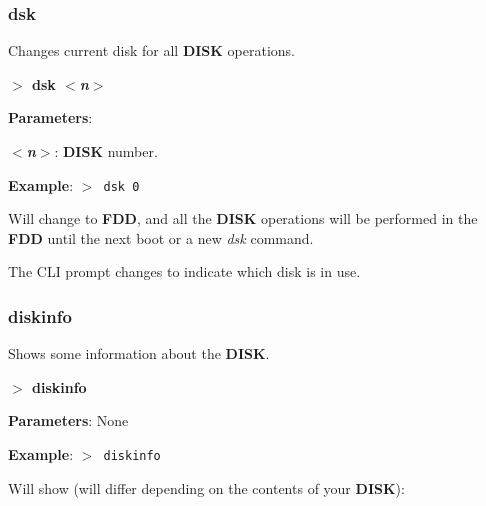 \documentclass[a4paper,11pt]{article}
\begin{document}
        \subsubsection{{\color{blue}dsk}}
        Changes current disk for all \textbf{DISK} operations.

        \hspace{1.9cm}\textbf{$>$ dsk \textit{$<$n$>$}}

        \textbf{Parameters}:

        \hspace{1cm}\textbf{\textit{$<$n$>$}}: \textbf{DISK} number.

        \textbf{Example}: \texttt{$>$ dsk 0}

        Will change to \textbf{FDD}, and all the \textbf{DISK} operations will
        be performed in the \textbf{FDD} until the next boot or a new \textit{dsk}
        command.

        The CLI prompt changes to indicate which disk is in use.

        \subsubsection{{\color{blue}diskinfo}}
        Shows some information about the \textbf{DISK}.

        \hspace{1.9cm}\textbf{$>$ diskinfo}

        \textbf{Parameters}: None

        \textbf{Example}: \texttt{$>$ diskinfo}

        Will show (will differ depending on the contents of your \textbf{DISK}):

        \texttt{
        }
\end{document}
